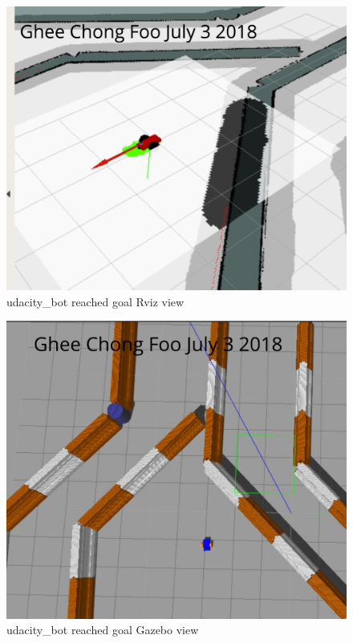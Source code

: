 \documentclass[10pt,journal,compsoc]{IEEEtran}
\begin{document}
\begin{figure}[thpb]
      \centering
      \includegraphics[width=\linewidth]{udacity_bot_reach_goal_rviz}
      \caption{udacity\_bot reached goal Rviz view}
      \label{fig:udacity_bot_reach_goal_rviz}
\end{figure}

\begin{figure}[thpb]
      \centering
      \includegraphics[width=\linewidth]{udacity_bot_reach_goal_gazebo}
      \caption{udacity\_bot reached goal Gazebo view}
      \label{fig:udacity_bot_reach_goal_gazebo}
\end{figure}
\end{document}
